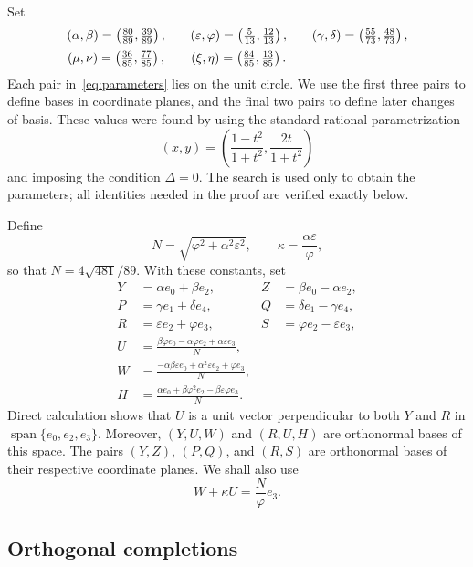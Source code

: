\documentclass[11pt]{article}
\theoremstyle{definition}
\newcommand{\spn}{\operatorname{span}}
\begin{document}
Set
\begin{equation}\label{eq:parameters}
\begin{array}{c@{\qquad}c@{\qquad}c}
(\alpha,\beta)=\left(\frac{80}{89},\frac{39}{89}\right),&
(\varepsilon,\varphi)=\left(\frac5{13},\frac{12}{13}\right),&
(\gamma,\delta)=\left(\frac{55}{73},\frac{48}{73}\right),\\[2mm]
(\mu,\nu)=\left(\frac{36}{85},\frac{77}{85}\right),&
(\xi,\eta)=\left(\frac{84}{85},\frac{13}{85}\right).
\end{array}
\end{equation}
Each pair in~\eqref{eq:parameters} lies on the unit circle.  We use the first
three pairs to define bases in coordinate planes, and the final two pairs to
define later changes of basis.  These values were found by using the standard
rational parametrization
\[
(x,y)=\left(\frac{1-t^2}{1+t^2},\frac{2t}{1+t^2}\right)
\]
and imposing the condition $\Delta=0$.  The search is used only to obtain the
parameters; all identities needed in the proof are verified exactly below.

Define
\[
N=\sqrt{\varphi^2+\alpha^2\varepsilon^2},
\qquad
\kappa=\frac{\alpha\varepsilon}{\varphi},
\]
so that $N=4\sqrt{481}/89$.  With these constants, set
\begin{align}
Y&=\alpha e_0+\beta e_2,&
Z&=\beta e_0-\alpha e_2,\label{eq:YZ}\\
P&=\gamma e_1+\delta e_4,&
Q&=\delta e_1-\gamma e_4,\label{eq:PQ}\\
R&=\varepsilon e_2+\varphi e_3,&
S&=\varphi e_2-\varepsilon e_3,\label{eq:RS}\\
U&=\frac{\beta\varphi e_0-\alpha\varphi e_2
            +\alpha\varepsilon e_3}{N},\label{eq:U}\\
W&=\frac{-\alpha\beta\varepsilon e_0+\alpha^2\varepsilon e_2
            +\varphi e_3}{N},\label{eq:W}\\
H&=\frac{\alpha e_0+\beta\varphi^2 e_2
            -\beta\varepsilon\varphi e_3}{N}.\label{eq:H}
\end{align}
Direct calculation shows that $U$ is a unit vector perpendicular to both $Y$
and $R$ in $\spn\{e_0,e_2,e_3\}$.  Moreover, $(Y,U,W)$ and $(R,U,H)$ are
orthonormal bases of this space.  The pairs $(Y,Z)$, $(P,Q)$, and $(R,S)$ are
orthonormal bases of their respective coordinate planes.  We shall also use
\begin{equation}\label{eq:key-WU}
W+\kappa U=\frac{N}{\varphi}e_3.
\end{equation}

\subsection{Orthogonal completions}
\end{document}
